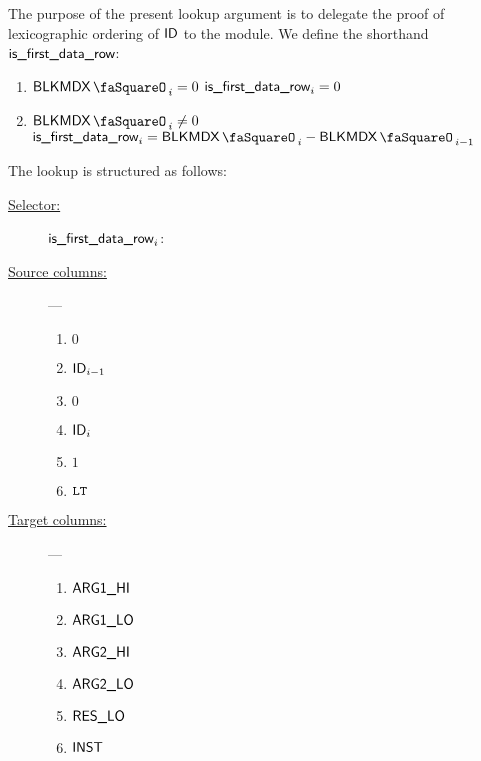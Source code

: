 The purpose of the present lookup argument is to delegate the proof of lexicographic ordering of $\textsf{ID}$ to the \wcpMod{} module. 
We define the shorthand $\textsf{is\_first\_data\_row}$:
\begin{enumerate}
	\item \If $\blkMdxStamp_{i} =    0$ \Then $\textsf{is\_first\_data\_row}_{i} = 0$
	\item \If $\blkMdxStamp_{i} \neq 0$ \Then $\locIsFirstDataRow_{i} = \blkMdxStamp_{i} - \blkMdxStamp_{i-1}$
\end{enumerate}
The lookup is structured as follows:
\begin{description}
	\item[\underline{Selector:}] $\textsf{is\_first\_data\_row}_{i}$:
	\item[\underline{Source columns:}] ---
		\begin{multicols}{3}
			\begin{enumerate}
				\item $0$
				\item $\textsf{ID}_{i - 1}$
				\item $0$
				\item $\textsf{ID}_{i}$
				\item $1$
				\item $\texttt{LT}$
			\end{enumerate}
		\end{multicols}
	\item[\underline{Target columns:}] ---
		\begin{multicols}{3}
		\begin{enumerate}
			\item $\textsf{ARG}\textsf{1}\textsf{\_HI}$
			\item $\textsf{ARG}\textsf{1}\textsf{\_LO}$
			\item $\textsf{ARG}\textsf{2}\textsf{\_HI}$
			\item $\textsf{ARG}\textsf{2}\textsf{\_LO}$
			\item $\textsf{RES}\textsf{\_LO}$
			\item $\textsf{INST}$
		\end{enumerate}
		\end{multicols}
\end{description}
